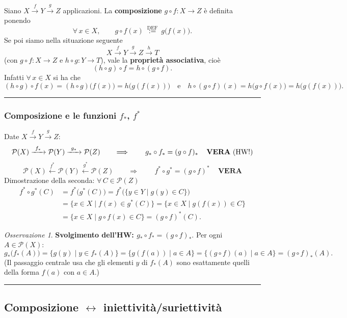 \documentclass[11pt,a4paper]{article}
\newcommand{\Pot}{\mathcal{P}}
\theoremstyle{definition}
\theoremstyle{plain}
\theoremstyle{remark}
\newtheorem*{osservazione}{Osservazione}
\begin{document}
Siano $X\xrightarrow{\ f\ }Y\xrightarrow{\ g\ }Z$ applicazioni. La \textbf{composizione} $g\circ f\colon X\to Z$ \`e definita ponendo
\[
\forall\,x\in X,\qquad g\circ f(x)\ \stackrel{\text{DEF}}{:=}\ g\bigl(f(x)\bigr).
\]
Se poi siamo nella situazione seguente
\[
X\xrightarrow{\ f\ }Y\xrightarrow{\ g\ }Z\xrightarrow{\ h\ }T
\]
(con $g\circ f\colon X\to Z$ e $h\circ g\colon Y\to T$), vale la \textbf{propriet\`a associativa}, cio\`e
\[
(h\circ g)\circ f=h\circ(g\circ f).
\]
Infatti $\forall\,x\in X$ si ha che
\[
(h\circ g)\circ f(x)=(h\circ g)\bigl(f(x)\bigr)=h\bigl(g(f(x))\bigr)
\quad\text{e}\quad
h\circ(g\circ f)(x)=h\bigl(g\circ f(x)\bigr)=h\bigl(g(f(x))\bigr).
\]

\bigskip\hrule\bigskip

\subsubsection*{Composizione e le funzioni $f_*$, $f^*$}

Date $X\xrightarrow{f}Y\xrightarrow{g}Z$:
\[
\Pot(X)\xrightarrow{\ f_*\ }\Pot(Y)\xrightarrow{\ g_*\ }\Pot(Z)\qquad\Longrightarrow\qquad
{\,g_*\circ f_*=(g\circ f)_*\,}\quad\text{\textbf{VERA} (HW!)}
\]
\[
\Pot(X)\xleftarrow{\ f^*\ }\Pot(Y)\xleftarrow{\ g^*\ }\Pot(Z)\qquad\Longrightarrow\qquad
{\,f^*\circ g^*=(g\circ f)^*\,}\quad\textbf{VERA}
\]
Dimostrazione della seconda: $\forall\,C\in\Pot(Z)$
\begin{align*}
f^*\circ g^*(C)&=f^*\bigl(g^*(C)\bigr)=f^*\bigl(\{y\in Y\mid g(y)\in C\}\bigr)\\
&=\{x\in X\mid f(x)\in g^*(C)\}=\{x\in X\mid g(f(x))\in C\}\\
&=\{x\in X\mid g\circ f(x)\in C\}=(g\circ f)^*(C).
\end{align*}

\begin{osservazione}
\textbf{Svolgimento dell'HW: $g_*\circ f_*=(g\circ f)_*$}. 
Per ogni $A\in\Pot(X)$:
\[
g_*\bigl(f_*(A)\bigr)=\{g(y)\mid y\in f_*(A)\}=\{g(f(a))\mid a\in A\}=\{(g\circ f)(a)\mid a\in A\}=(g\circ f)_*(A).
\]
(Il passaggio centrale usa che gli elementi $y$ di $f_*(A)$ sono esattamente quelli della forma $f(a)$ con $a\in A$.)
\end{osservazione}

\bigskip\hrule\bigskip

\subsection{Composizione $\longleftrightarrow$ iniettivit\`a/suriettivit\`a}
\end{document}
